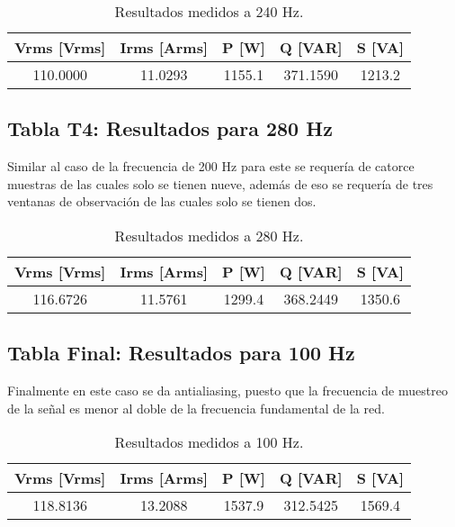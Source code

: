    \begin{table}[h!]
        \centering
        \begin{tabular}{@{}ccccc@{}}
            \toprule
            Vrms [Vrms] & Irms [Arms] & P [W] & Q [VAR] & S [VA] \\ \midrule
            110.0000 & 11.0293 & 1155.1 & 371.1590 & 1213.2 \\ 
            \bottomrule
        \end{tabular}
        \caption{Resultados medidos a 240 Hz.}
    \end{table}

    \subsection*{Tabla T4: Resultados para 280 Hz}
    Similar al caso de la frecuencia de 200 Hz para este se requería de catorce muestras de las cuales solo se tienen nueve, además de eso se requería de tres ventanas de observación de las cuales solo se tienen dos.
    \begin{table}[h!]
        \centering
        \begin{tabular}{@{}ccccc@{}}
            \toprule
            Vrms [Vrms] & Irms [Arms] & P [W] & Q [VAR] & S [VA] \\ \midrule
            116.6726 & 11.5761 & 1299.4 & 368.2449 & 1350.6  \\ 
            \bottomrule
        \end{tabular}
        \caption{Resultados medidos a 280 Hz.}
    \end{table}

    \subsection*{Tabla Final: Resultados para 100 Hz}
    Finalmente en este caso se da antialiasing, puesto que la frecuencia de muestreo de la señal es menor al doble de la frecuencia fundamental de la red.
    \begin{table}[h!]
        \centering
        \begin{tabular}{@{}ccccc@{}}
            \toprule
            Vrms [Vrms] & Irms [Arms] & P [W] & Q [VAR] & S [VA] \\ \midrule
            118.8136 & 13.2088 & 1537.9 & 312.5425 & 1569.4 \\ 
            \bottomrule
        \end{tabular}
        \caption{Resultados medidos a 100 Hz.}
    \end{table}
